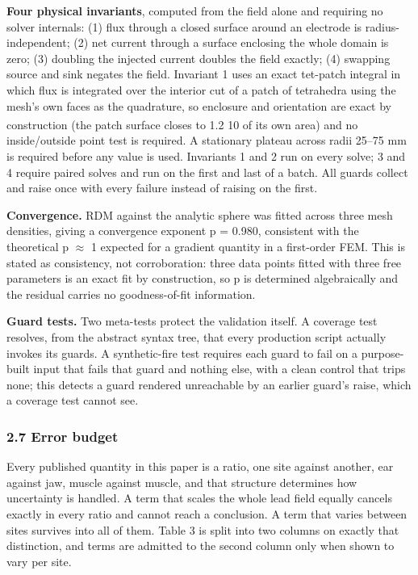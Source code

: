 \documentclass[
  11pt,
  a4paper,
]{article}
\newcounter{none} %
\begin{document}
\textbf{Four physical invariants}, computed from the field alone and requiring no
solver internals: (1) flux through a closed surface around an electrode is
radius-independent; (2) net current through a surface enclosing the whole domain
is zero; (3) doubling the injected current doubles the field exactly; (4)
swapping source and sink negates the field. Invariant 1 uses an exact tet-patch
integral in which flux is integrated over the interior cut of a patch of
tetrahedra using the mesh's own faces as the quadrature, so enclosure and
orientation are exact by construction (the patch surface closes to 1.2 \texttimes{} 10\textsuperscript{}
of its own area) and no inside/outside point test is required. A stationary
plateau across radii 25--75 mm is required before any value is used. Invariants 1
and 2 run on every solve; 3 and 4 require paired solves and run on the first and
last of a batch. All guards collect and raise once with every failure instead of
raising on the first.

\textbf{Convergence.} RDM against the analytic sphere was fitted across three mesh
densities, giving a convergence exponent p = 0.980, consistent with the
theoretical p $\approx$ 1 expected for a gradient quantity in a first-order FEM. This is
stated as consistency, not corroboration: three data points fitted with three
free parameters is an exact fit by construction, so p is determined
algebraically and the residual carries no goodness-of-fit information.

\textbf{Guard tests.} Two meta-tests protect the validation itself. A coverage test
resolves, from the abstract syntax tree, that every production script actually
invokes its guards. A synthetic-fire test requires each guard to fail on a
purpose-built input that fails that guard and nothing else, with a clean control
that trips none; this detects a guard rendered unreachable by an earlier guard's
raise, which a coverage test cannot see.

\subsubsection{2.7 Error budget}\label{error-budget}

Every published quantity in this paper is a ratio, one site against another,
ear against jaw, muscle against muscle, and that structure determines how
uncertainty is handled. A term that scales the whole lead field equally cancels
exactly in every ratio and cannot reach a conclusion. A term that varies between
sites survives into all of them. Table 3 is split into two columns on exactly
that distinction, and terms are admitted to the second column only when shown to
vary per site.
\end{document}
